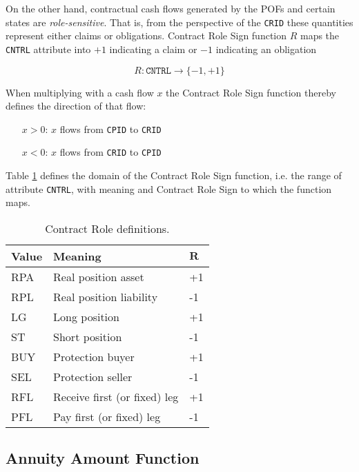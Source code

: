 \documentclass[9pt,oneside]{amsart}
\newcommand{\attr}[1]{\texttt{#1}}
\begin{document}
\begin{multicols}{2}
On the other hand, contractual cash flows generated by the POFs and certain states are \textit{role-sensitive}. That is, from the perspective of the \attr{CRID} these quantities represent either claims or obligations. Contract Role Sign function $R$ maps the \attr{CNTRL} attribute into $+1$ indicating a claim or $-1$ indicating an obligation

\[
	R : \attr{CNTRL} \rightarrow \{-1, +1 \}
\]

When multiplying with a cash flow $x$ the Contract Role Sign function thereby defines the direction of that flow:

\begin{itemize}
	\item[$x>0$:] $x$ flows from \attr{CPID} to \attr{CRID}

	\item[$x<0$:] $x$ flows from \attr{CRID} to \attr{CPID}
\end{itemize}

Table \ref{tbl:cntrl} defines the domain of the Contract Role Sign function, i.e. the range of attribute \attr{CNTRL}, with meaning and Contract Role Sign to which the function maps.


\begin{table}[H]
	\centering
	\begin{tabular}{| p{0.5in}p{1.5in}p{0.2in} |}
	\hline
	\textbf{Value} & \textbf{Meaning} & $\textbf{R}$ \\
	\hline
	RPA & Real position asset & +1 \\
	\hline
	RPL & Real position liability & -1 \\
	\hline
	LG & Long position & +1 \\
	\hline
	ST & Short position & -1 \\
	\hline
	BUY & Protection buyer & +1 \\
	\hline
	SEL & Protection seller & -1 \\
	\hline
	RFL & Receive first (or fixed) leg & +1 \\
	\hline
	PFL & Pay first (or fixed) leg & -1 \\
	\hline
	\end{tabular}
	\caption{Contract Role definitions.}
	\label{tbl:cntrl}
\end{table}


\subsection{Annuity Amount Function}\label{sec:annamount}


\end{multicols}
\end{document}
